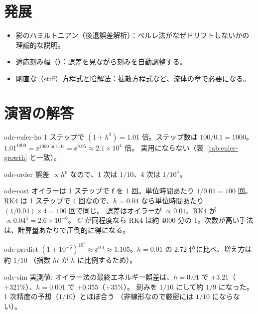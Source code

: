 \section{発展}\label{sec:ode-advanced}
\begin{itemize}
  \item 影のハミルトニアン（後退誤差解析）：ベルレ法がなぜドリフトしないかの理論的な説明\cite{hairer}。
  \item 適応刻み幅（）：誤差を見ながら刻みを自動調整する。
  \item 剛直な（stiff）方程式と陰解法：拡散方程式など、流体の章で必要になる。
\end{itemize}

\section{演習の解答}\label{sec:ode-solutions}

\begin{solution}{ode-euler-ho}
1 ステップで $(1+h^2)=1.01$ 倍。ステップ数は $100/0.1=1000$。
$1.01^{1000}=\ee^{1000\ln1.01}=\ee^{9.95}\approx2.1\times10^{4}$ 倍。
実用にならない（表~\ref{tab:euler-growth} と一致）。
\end{solution}

\begin{solution}{ode-order}
誤差 $\propto h^p$ なので、1 次は $1/10$、4 次は $1/10^4$。
\end{solution}

\begin{solution}{ode-cost}
オイラーは 1 ステップで $\mathbf f$ を 1 回。単位時間あたり $1/0.01=100$ 回。
RK4 は 1 ステップで 4 回なので、$h=0.04$ なら単位時間あたり $(1/0.04)\times4=100$ 回で同じ。
誤差はオイラーが $\propto0.01$、RK4 が $\propto0.04^4=2.6\times10^{-6}$。
$C$ が同程度なら RK4 は約 4000 分の 1。次数が高い手法は、計算量あたりで圧倒的に得になる。
\end{solution}

\begin{solution}{ode-predict}
$(1+10^{-6})^{10^5}\approx\ee^{0.1}\approx1.105$。$h=0.01$ の 2.72 倍に比べ、増え方は約 $1/10$
（指数 $ht$ が $h$ に比例するため）。
\end{solution}

\begin{solution}{ode-sim}
実測値: オイラー法の最終エネルギー誤差は、$h=0.01$ で $+3.21$（$+321\%$）、$h=0.001$ で $+0.355$（$+35\%$）。
刻みを $1/10$ にして約 $1/9$ になった。1 次精度の予想（$1/10$）とほぼ合う
（非線形なので厳密には $1/10$ にならない）。
\end{solution}
